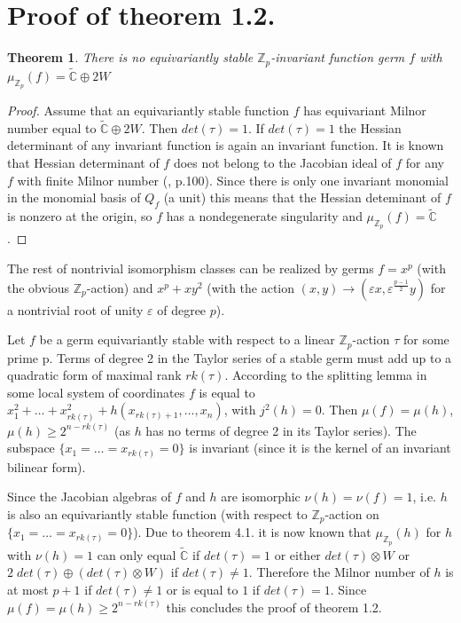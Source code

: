 \documentclass{amsart}
\newtheorem{theorem}[subsection]{Theorem}
\begin{document}
\section{Proof of theorem 1.2.}
 \begin{theorem}
 
 There is no equivariantly stable $\mathbb{Z}_p$-invariant function germ $f$ with $\mu_{ \mathbb{Z}_p}(f)=\tilde{\mathbb{C}} \oplus 2 W$ 
 
 \end{theorem}
 
 \begin{proof} 
 
Assume that an equivariantly stable function $f$ has equivariant Milnor number equal to  $\tilde{\mathbb{C}} \oplus 2 W$. Then $det(\tau)=1$. If $det(\tau)=1$ the Hessian determinant of any invariant function is again an invariant function. It is known that  Hessian determinant of $f$ does not belong to the Jacobian ideal of $f$ for any $f$ with finite Milnor number (\cite{9}, p.100). Since there is only one invariant monomial in the monomial basis of $Q_f$ (a unit) this means that the Hessian deteminant of $f$ is nonzero at the origin, so $f$ has a nondegenerate singularity and  $\mu_{ \mathbb{Z}_p}(f)=\tilde{\mathbb{C}}$.
 
 \end{proof}

The rest of nontrivial isomorphism classes can be realized by germs $f=x^p$ (with the obvious $\mathbb{Z}_p$-action) and $x^p + x y^2$ (with the action $(x,y) \longrightarrow (\varepsilon x, \varepsilon^{\frac{p-1}{2}} y)$ for a nontrivial root of unity $\varepsilon$ of degree $p$).

\medskip

Let $f$ be a germ equivariantly stable with respect to a linear $\mathbb{Z}_p$-action $\tau$ for some prime p. 
Terms of degree 2 in the Taylor series of a stable germ must add up to a quadratic form of maximal rank  $rk(\tau)$. According to the splitting lemma in some local system of coordinates  $f$ is equal to $x_1^2 + \ldots + x_{rk(\tau)}^2 + h(x_{rk(\tau)+1}, \ldots, x_n)$, with $j^2 (h)=0$. Then $\mu(f) = \mu(h)$, $\mu(h) \geq 2^{n-rk(\tau)}$ (as $h$ has no terms of degree 2 in its Taylor series). The subspace $\{x_1= \ldots = x_{rk(\tau)} = 0\}$ is invariant (since it is the kernel of an invariant bilinear form). 

Since the Jacobian algebras of $f$ and $h$ are isomorphic $\nu(h) = \nu(f) = 1$, i.e. $h$ is also an equivariantly stable function (with respect to $\mathbb{Z}_p$-action  on  $\{x_1= \ldots = x_{rk(\tau)} = 0\}$). Due to theorem 4.1. it is now known that $\mu_{ \mathbb{Z}_p}(h)$ for $h$ with $\nu(h)=1$ can only equal $\tilde{\mathbb{C}}$ if $det(\tau)=1$ or either $det(\tau) \otimes W$ or $2 \; det(\tau) \oplus (det(\tau) \otimes W)$ if $det(\tau) \neq 1$. Therefore the Milnor number of $h$ is at most $p+1$ if $det(\tau) \neq 1$ or is equal to $1$ if $det(\tau) = 1$. Since $\mu(f) = \mu(h) \geq 2^{n-rk(\tau)}$ this concludes the proof of theorem 1.2.
\end{document}
